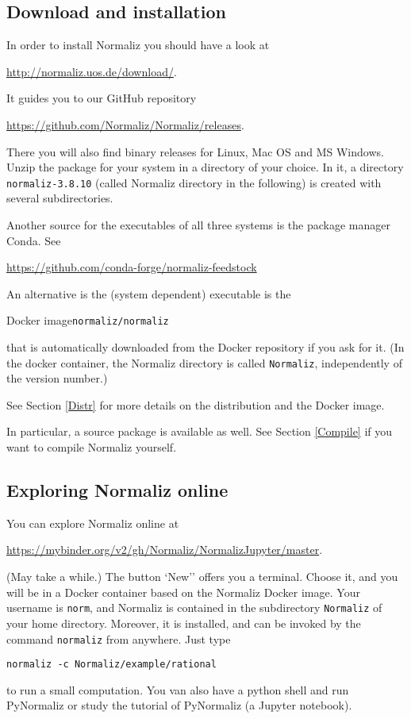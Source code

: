 \documentclass[12pt,a4paper]{scrartcl}
\theoremstyle{definition}
\def\ttt{\texttt}
\def\version{3.8.10}
\def\NmzDir{normaliz-\version}
\begin{document}
\subsection{Download and installation}

In order to install Normaliz you should have a look at
\begin{center}
	\url{http://normaliz.uos.de/download/}.
\end{center}
It guides  you to our GitHub repository
\begin{center}
	\url{https://github.com/Normaliz/Normaliz/releases}.
\end{center}
There you will also find binary releases for Linux, Mac OS and MS Windows. Unzip the  package for your system  in a directory of your choice. In it, a
directory \ttt{\NmzDir} (called Normaliz directory in the
following) is created with several subdirectories.

Another source for the executables of all three systems is the package manager Conda. See 
\begin{center}
	\url{https://github.com/conda-forge/normaliz-feedstock}
\end{center}


An alternative is the (system dependent) executable is the  
\begin{center}
	Docker image\qquad \verb|normaliz/normaliz|
\end{center}
that is automatically downloaded from the Docker repository if you ask for it. (In the docker container, the Normaliz directory is called \verb|Normaliz|, independently of the version number.)

See Section \ref{Distr} for more details on the distribution and the Docker image.

In particular, a source package is available as well. See Section \ref{Compile} if you want to compile Normaliz yourself. 

\subsection{Exploring Normaliz online}

You can explore Normaliz online at
\begin{center}
	\url{https://mybinder.org/v2/gh/Normaliz/NormalizJupyter/master}. 
\end{center}
(May take a while.) The button `New'' offers you a terminal. Choose it, and you will be in a Docker container based on the Normaliz Docker image. Your username is \verb|norm|, and Normaliz is contained in the subdirectory \verb|Normaliz| of your home directory. Moreover, it is installed, and can be invoked by the command \verb|normaliz| from anywhere. Just type
\begin{Verbatim}
normaliz -c Normaliz/example/rational
\end{Verbatim}
to run a small computation. You van also have a python shell and run PyNormaliz or study the tutorial of PyNormaliz (a Jupyter notebook).
\end{document}
